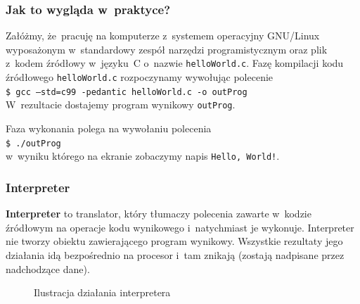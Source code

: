 \documentclass[10pt,t]{beamer}
\begin{document}
\begin{frame}
  \frametitle{Jak to wygląda w~praktyce?}


  Załóżmy, że~pracuję na komputerze z~systemem operacyjny GNU/Linux
  wyposażonym w~standardowy zespół narzędzi programistycznym oraz plik
  z~kodem źródłowy w~języku~C o~nazwie \texttt{helloWorld.c}. Fazę
  kompilacji kodu źródłowego \texttt{helloWorld.c} rozpoczynamy wywołując
  polecenie \\
  \texttt{\$ gcc --std=c99 -pedantic helloWorld.c -o outProg} \\
  W~rezultacie dostajemy program wynikowy \texttt{outProg}.

  Faza wykonania polega na wywołaniu polecenia \\
  \texttt{\$ ./outProg} \\
  w~wyniku którego na ekranie zobaczymy napis \texttt{Hello, World!}.

\end{frame}






\begin{frame}
  \frametitle{Interpreter}


  \textbf{Interpreter} to translator, który tłumaczy polecenia zawarte
  w~kodzie źródłowym na operacje kodu wynikowego i~natychmiast je wykonuje.
  Interpreter \alert{nie} tworzy obiektu zawierającego program wynikowy.
  Wszystkie rezultaty jego działania idą bezpośrednio na procesor i~tam
  znikają (zostają nadpisane przez nadchodzące dane).





  \begin{figure}


    \caption{Ilustracja działania interpretera}


  \end{figure}

\end{frame}
\end{document}
